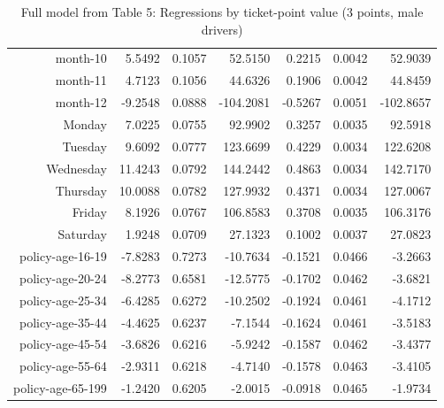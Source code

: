 \documentclass[10pt]{article}
\begin{document}
\begin{table}[ht]
\begin{tabular}{rrrrrrr}
  month-10 & 5.5492 & 0.1057 & 52.5150 & 0.2215 & 0.0042 & 52.9039 \\ 
  month-11 & 4.7123 & 0.1056 & 44.6326 & 0.1906 & 0.0042 & 44.8459 \\ 
  month-12 & -9.2548 & 0.0888 & -104.2081 & -0.5267 & 0.0051 & -102.8657 \\ 
  Monday & 7.0225 & 0.0755 & 92.9902 & 0.3257 & 0.0035 & 92.5918 \\ 
  Tuesday & 9.6092 & 0.0777 & 123.6699 & 0.4229 & 0.0034 & 122.6208 \\ 
  Wednesday & 11.4243 & 0.0792 & 144.2442 & 0.4863 & 0.0034 & 142.7170 \\ 
  Thursday & 10.0088 & 0.0782 & 127.9932 & 0.4371 & 0.0034 & 127.0067 \\ 
  Friday & 8.1926 & 0.0767 & 106.8583 & 0.3708 & 0.0035 & 106.3176 \\ 
  Saturday & 1.9248 & 0.0709 & 27.1323 & 0.1002 & 0.0037 & 27.0823 \\ 
  policy-age-16-19 & -7.8283 & 0.7273 & -10.7634 & -0.1521 & 0.0466 & -3.2663 \\ 
  policy-age-20-24 & -8.2773 & 0.6581 & -12.5775 & -0.1702 & 0.0462 & -3.6821 \\ 
  policy-age-25-34 & -6.4285 & 0.6272 & -10.2502 & -0.1924 & 0.0461 & -4.1712 \\ 
  policy-age-35-44 & -4.4625 & 0.6237 & -7.1544 & -0.1624 & 0.0461 & -3.5183 \\ 
  policy-age-45-54 & -3.6826 & 0.6216 & -5.9242 & -0.1587 & 0.0462 & -3.4377 \\ 
  policy-age-55-64 & -2.9311 & 0.6218 & -4.7140 & -0.1578 & 0.0463 & -3.4105 \\ 
  policy-age-65-199 & -1.2420 & 0.6205 & -2.0015 & -0.0918 & 0.0465 & -1.9734 \\ 
   \hline
\end{tabular}
\caption{Full model from Table 5: Regressions by ticket-point value (3 points, male drivers)} 
\label{tab_5_3_pts_M}
\end{table}


\clearpage
\pagebreak



\end{document}
